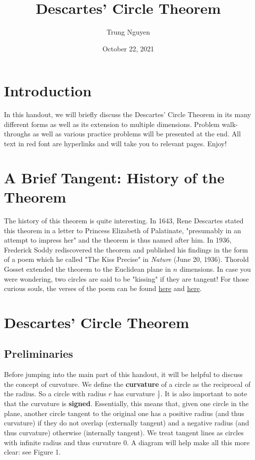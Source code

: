 \documentclass{article}
\title{Descartes' Circle Theorem}
\author{Trung Nguyen}
\date{October 22, 2021}
\begin{document}
\maketitle

\section{Introduction}
In this handout, we will briefly discuss the Descartes' Circle Theorem in its many different forms as well as its extension to multiple dimensions. Problem walk-throughs as well as various practice problems will be presented at the end. All text in red font are hyperlinks and will take you to relevant pages. Enjoy!

\section{A Brief Tangent: History of the Theorem}
The history of this theorem is quite interesting. In 1643, Rene Descartes stated this theorem in a letter to Princess Elizabeth of Palatinate, "presumably in an attempt to impress her" and the theorem is thus named after him. In 1936, Frederick Soddy rediscovered the theorem and published his findings in the form of a poem which he called "The Kiss Precise" in \textit{Nature} (June 20, 1936). Thorold Gosset extended the theorem to the Euclidean plane in $n$ dimensions. In case you were wondering, two circles are said to be "kissing" if they are tangent! For those curious souls, the verses of the poem can be found \href{https://www.nature.com/articles/1371021a0.pdf}{here} and \href{https://www.pleacher.com/mp/mpoetry/fourcirc.html}{here}.

\section{Descartes' Circle Theorem}
\subsection{Preliminaries}
Before jumping into the main part of this handout, it will be helpful to discuss the concept of curvature. We define the \textbf{curvature} of a circle as the reciprocal of the radius. So a circle with radius $r$ has curvature $\frac 1r$. It is also important to note that the curvature is \textbf{signed}. Essentially, this means that, given one circle in the plane, another circle tangent to the original one has a positive radius (and thus curvature) if they do not overlap (externally tangent) and a negative radius (and thus curvature) otherwise (internally tangent). We treat tangent lines as circles with infinite radius and thus curvature $0$. A diagram will help make all this more clear: see Figure 1.
\end{document}
